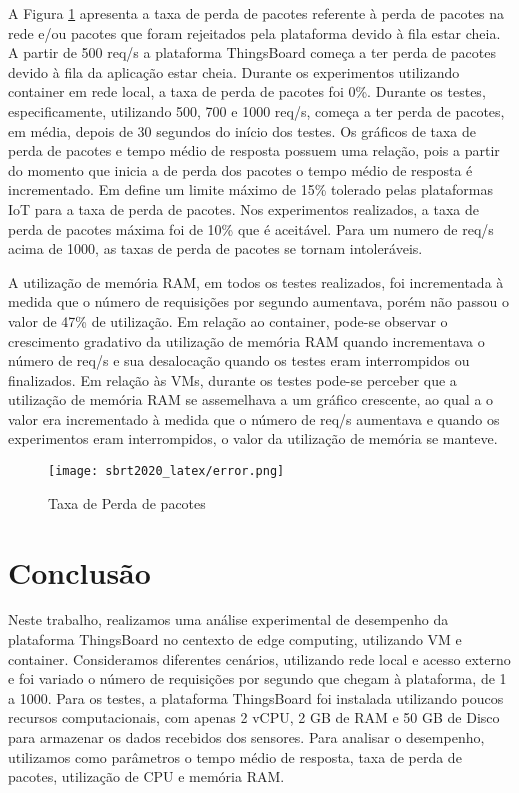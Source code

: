 \documentclass{sbrt}
\begin{document}
A Figura \ref{fig:error} apresenta a taxa de perda de pacotes referente à perda de pacotes na rede e/ou pacotes que foram rejeitados pela plataforma devido à fila estar cheia. A partir de 500 req/s a plataforma ThingsBoard começa a ter perda de pacotes devido à fila da aplicação estar cheia. Durante os experimentos utilizando container em rede local, a taxa de perda de pacotes foi 0{\%}. Durante os testes, especificamente, utilizando 500, 700 e 1000 req/s, começa a ter perda de pacotes, em média, depois de 30 segundos do início dos testes. Os gráficos de taxa de perda de pacotes e tempo médio de resposta possuem uma relação, pois a partir do momento que inicia a de perda dos pacotes o tempo médio de resposta é incrementado. Em \cite{da2018performance} define um limite máximo de 15{\%} tolerado pelas plataformas IoT para a taxa de perda de pacotes. Nos experimentos realizados, a taxa de perda de pacotes máxima foi de 10{\%} que é aceitável. Para um numero de req/s acima de 1000, as taxas de perda de pacotes se tornam intoleráveis. 

A utilização de memória RAM, em todos os testes realizados, foi incrementada à medida que o número de requisições por segundo aumentava, porém não passou o valor de 47{\%} de utilização. Em relação ao container, pode-se observar o crescimento gradativo da utilização de memória RAM quando incrementava o número de req/s e sua desalocação quando os testes eram interrompidos ou finalizados. Em relação às VMs, durante os testes pode-se perceber que a utilização de memória RAM se assemelhava a um gráfico crescente, ao qual a o valor era incrementado à medida que o número de req/s aumentava e quando os experimentos eram interrompidos, o valor da utilização de memória se manteve.

\begin{figure}
\centering
\captionsetup{justification=centering}
\begin{center}
\texttt{[image: sbrt2020\_latex/error.png]}
\vspace*{-9mm}
\end{center}
\caption{Taxa de Perda de pacotes}
\label{fig:error}
\end{figure}

\section{Conclusão}\label{sec:conc}

Neste trabalho, realizamos uma análise experimental de desempenho da plataforma ThingsBoard no centexto de edge computing, utilizando VM e container. Consideramos diferentes cenários, utilizando rede local e acesso externo e foi variado o número de requisições por segundo que chegam à plataforma, de 1 a 1000. Para os testes, a plataforma ThingsBoard foi instalada utilizando poucos recursos computacionais, com apenas 2 vCPU, 2 GB de RAM e 50 GB de Disco para armazenar os dados recebidos dos sensores. Para analisar o desempenho, utilizamos como parâmetros o tempo médio de resposta, taxa de perda de pacotes, utilização de CPU e memória RAM. 
\end{document}
